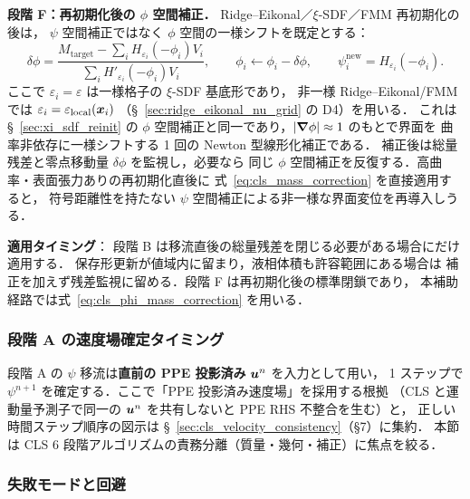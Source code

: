 \medskip
\noindent\textbf{段階 F：再初期化後の $\phi$ 空間補正．}
Ridge--Eikonal／$\xi$-SDF／FMM 再初期化の後は，
$\psi$ 空間補正ではなく $\phi$ 空間の一様シフトを既定とする：
\begin{equation}
  \delta\phi
  =
  \frac{M_\text{target}-\sum_i H_{\varepsilon_i}(-\phi_i)V_i}
       {\sum_i H'_{\varepsilon_i}(-\phi_i)V_i},
  \qquad
  \phi_i \leftarrow \phi_i-\delta\phi,\qquad
  \psi_i^{\text{new}} = H_{\varepsilon_i}(-\phi_i).
  \label{eq:cls_phi_mass_correction}
\end{equation}
ここで $\varepsilon_i=\varepsilon$ は一様格子の $\xi$-SDF 基底形であり，
非一様 Ridge--Eikonal/FMM では
$\varepsilon_i=\varepsilon_\text{local}(\bm{x}_i)$
（§~\ref{sec:ridge_eikonal_nu_grid} の D4）を用いる．
これは §~\ref{sec:xi_sdf_reinit} の
$\phi$ 空間補正と同一であり，$|\bm{\nabla}\phi|\approx1$ のもとで界面を
曲率非依存に一様シフトする 1 回の Newton 型線形化補正である．
補正後は総量残差と零点移動量 $\delta\phi$ を監視し，必要なら
同じ $\phi$ 空間補正を反復する．高曲率・表面張力ありの再初期化直後に
式~\eqref{eq:cls_mass_correction} を直接適用すると，
符号距離性を持たない $\psi$ 空間補正による非一様な界面変位を再導入しうる．

\noindent\textbf{適用タイミング}：
段階 B は移流直後の総量残差を閉じる必要がある場合にだけ適用する．
保存形更新が値域内に留まり，液相体積も許容範囲にある場合は
補正を加えず残差監視に留める．段階 F は再初期化後の標準閉鎖であり，
本補助経路では式~\eqref{eq:cls_phi_mass_correction} を用いる．

\subsubsection{段階 A の速度場確定タイミング}
\label{sec:cls_velocity_timing}

段階 A の $\psi$ 移流は\textbf{直前の PPE 投影済み} $\bm{u}^n$ を入力として用い，
1 ステップで $\psi^{n+1}$ を確定する．ここで「PPE 投影済み速度場」を採用する根拠
（CLS と運動量予測子で同一の $\bm{u}^n$ を共有しないと PPE RHS 不整合を生む）と，
正しい時間ステップ順序の図示は §~\ref{sec:cls_velocity_consistency}（§7）に集約．
本節は CLS 6 段階アルゴリズムの責務分離（質量・幾何・補正）に焦点を絞る．

\subsubsection{失敗モードと回避}
\label{sec:cls_failure_modes}

